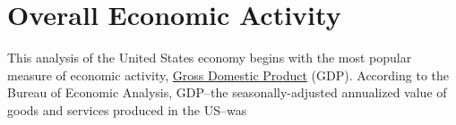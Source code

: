 \documentclass{report}
\begin{document}
\section*{\color{darkgray} \LARGE Overall Economic Activity}
\label{sec:oea}
\begin{minipage}{0.61\textwidth}
\small This analysis of the United States economy begins with the most popular measure of economic activity, \href{https://www.bea.gov/data/gdp/gross-domestic-product}{Gross Domestic Product} (GDP). According to the Bureau of Economic Analysis, GDP--the seasonally-adjusted annualized value of goods and services produced in the US--was \\

\\
\end{minipage}\hfill
\begin{minipage}{0.34\textwidth}
\\
\end{minipage}
\end{document}
